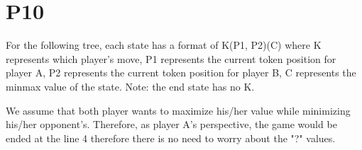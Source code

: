 \documentclass{article}
\begin{document}
\section*{P10}

For the following tree, each state has a format of K(P1, P2)(C) where K represents which player's move, P1 represents the current token position for player A, P2 represents the current token position for player B, C represents the minmax value of the state. Note: the end state has no K.


\vspace{5mm}
\hspace{5mm}
We assume that both player wants to maximize his/her value while minimizing his/her opponent's. Therefore, as player A's perspective, the game would be ended at the line 4 therefore there is no need to worry about the "?" values.
\end{document}
